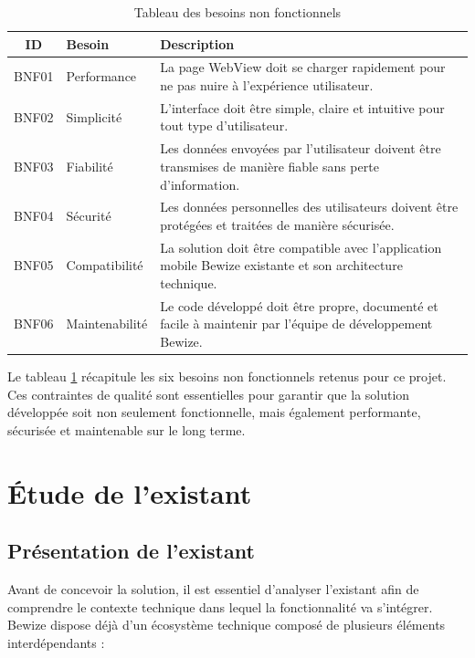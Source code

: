 \begin{table}[H]
\centering
\caption{Tableau des besoins non fonctionnels}
\label{tab:besoins_non_fonctionnels}
\renewcommand{\arraystretch}{1.8}
\begin{tabular}{|c|p{4cm}|p{7cm}|}
\hline
\textbf{ID} & \textbf{Besoin} & \textbf{Description} \\
\hline
BNF01 & Performance & La page WebView doit se charger rapidement pour 
ne pas nuire à l'expérience utilisateur. \\
\hline
BNF02 & Simplicité & L'interface doit être simple, claire et intuitive 
pour tout type d'utilisateur. \\
\hline
BNF03 & Fiabilité & Les données envoyées par l'utilisateur doivent être 
transmises de manière fiable sans perte d'information. \\
\hline
BNF04 & Sécurité & Les données personnelles des utilisateurs doivent 
être protégées et traitées de manière sécurisée. \\
\hline
BNF05 & Compatibilité & La solution doit être compatible avec 
l'application mobile Bewize existante et son architecture technique. \\
\hline
BNF06 & Maintenabilité & Le code développé doit être propre, documenté 
et facile à maintenir par l'équipe de développement Bewize. \\
\hline
\end{tabular}
\end{table}

Le tableau \ref{tab:besoins_non_fonctionnels} récapitule les six besoins 
non fonctionnels retenus pour ce projet. Ces contraintes de qualité 
sont essentielles pour garantir que la solution développée soit non 
seulement fonctionnelle, mais également performante, sécurisée et 
maintenable sur le long terme.

\section{Étude de l'existant}

\subsection{Présentation de l'existant}
Avant de concevoir la solution, il est essentiel d'analyser l'existant 
afin de comprendre le contexte technique dans lequel la fonctionnalité 
va s'intégrer. Bewize dispose déjà d'un écosystème technique composé 
de plusieurs éléments interdépendants :

